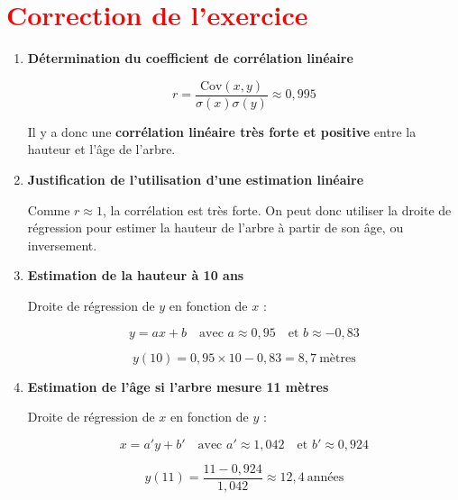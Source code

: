 \documentclass[12pt,a4paper]{article}
\begin{document}
\section*{\textcolor{red}{Correction de l'exercice}}

\begin{enumerate}
    \item \textbf{Détermination du coefficient de corrélation linéaire}

    \[
    r = \frac{\text{Cov}(x, y)}{\sigma(x)\sigma(y)} \approx 0{,}995
    \]

    Il y a donc une \textbf{corrélation linéaire très forte et positive} entre la hauteur et l’âge de l’arbre.

    \item \textbf{Justification de l’utilisation d’une estimation linéaire}

    Comme \( r \approx 1 \), la corrélation est très forte. On peut donc utiliser la droite de régression pour estimer la hauteur de l’arbre à partir de son âge, ou inversement.

    \item \textbf{Estimation de la hauteur à 10 ans}

    Droite de régression de \( y \) en fonction de \( x \) :

    \[
    y = ax + b \quad \text{avec } a \approx 0{,}95 \quad \text{et } b \approx -0{,}83
    \]

    \[
    y(10) = 0{,}95 \times 10 - 0{,}83 = \boxed{8{,}7~\text{mètres}}
    \]

    \item \textbf{Estimation de l’âge si l’arbre mesure 11 mètres}

    Droite de régression de \( x \) en fonction de \( y \) :

    \[
    x = a'y + b' \quad \text{avec } a' \approx 1{,}042 \quad \text{et } b' \approx 0{,}924
    \]

    \[
    y(11) = \frac{11 - 0{,}924}{1{,}042} \approx \boxed{12{,}4~\text{années}}
    \]

\end{enumerate}
\end{document}
